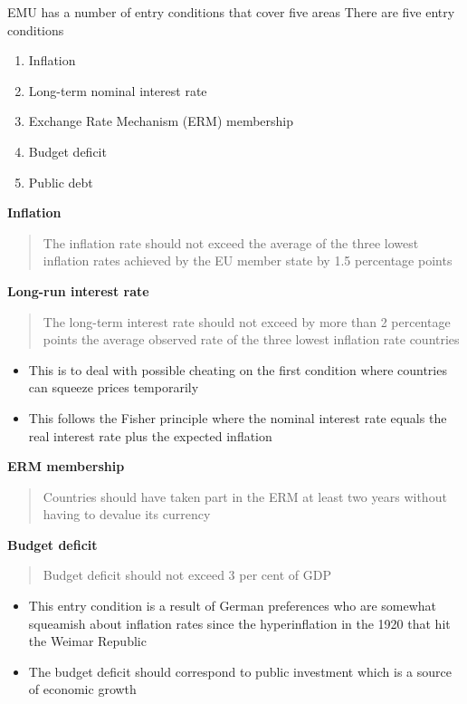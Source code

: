 \documentclass{beamer}
\begin{document}
\begin{frame}
 EMU has a number of entry conditions that cover five areas
There are five entry conditions
\begin{enumerate}
  \item Inflation
  \item Long-term nominal interest rate
  \item Exchange Rate Mechanism (ERM) membership
  \item Budget deficit
  \item Public debt
\end{enumerate}
\end{frame}


\begin{frame}
  \textbf{Inflation}
  \begin{quote}
    The inflation rate should not exceed the average of the three lowest inflation rates achieved by the EU member state by 1.5 percentage points 
  \end{quote}
    \textbf{Long-run interest rate}
    \begin{quote}
      The long-term interest rate should not exceed by more than 2 percentage points the average observed rate of the three lowest inflation rate countries
    \end{quote}
  \begin{itemize}
    \item This is to deal with possible cheating on the first condition where countries can squeeze prices temporarily
    \item This follows the Fisher principle where the nominal interest rate equals the real interest rate plus the expected inflation
  \end{itemize}
\end{frame}


\begin{frame} 
  \textbf{ERM membership}
  \begin{quote}
    Countries should have taken part in the ERM at least two years without having to devalue its currency 
  \end{quote}
  
  \textbf{Budget deficit}
  \begin{quote}
    Budget deficit should not exceed 3 per cent of GDP
  \end{quote}
   \begin{itemize}
      \item  This entry condition is a result of German preferences who are somewhat squeamish about inflation rates since the hyperinflation in the 1920 that hit the Weimar Republic
     \item The budget deficit should correspond to public investment which is a source of economic growth 
   \end{itemize}  
\end{frame}
\end{document}
